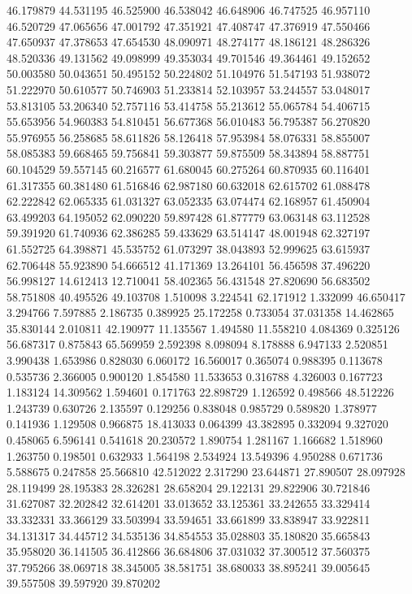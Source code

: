 46.179879
44.531195
46.525900
46.538042
46.648906
46.747525
46.957110
46.520729
47.065656
47.001792
47.351921
47.408747
47.376919
47.550466
47.650937
47.378653
47.654530
48.090971
48.274177
48.186121
48.286326
48.520336
49.131562
49.098999
49.353034
49.701546
49.364461
49.152652
50.003580
50.043651
50.495152
50.224802
51.104976
51.547193
51.938072
51.222970
50.610577
50.746903
51.233814
52.103957
53.244557
53.048017
53.813105
53.206340
52.757116
53.414758
55.213612
55.065784
54.406715
55.653956
54.960383
54.810451
56.677368
56.010483
56.795387
56.270820
55.976955
56.258685
58.611826
58.126418
57.953984
58.076331
58.855007
58.085383
59.668465
59.756841
59.303877
59.875509
58.343894
58.887751
60.104529
59.557145
60.216577
61.680045
60.275264
60.870935
60.116401
61.317355
60.381480
61.516846
62.987180
60.632018
62.615702
61.088478
62.222842
62.065335
61.031327
63.052335
63.074474
62.168957
61.450904
63.499203
64.195052
62.090220
59.897428
61.877779
63.063148
63.112528
59.391920
61.740936
62.386285
59.433629
63.514147
48.001948
62.327197
61.552725
64.398871
45.535752
61.073297
38.043893
52.999625
63.615937
62.706448
55.923890
54.666512
41.171369
13.264101
56.456598
37.496220
56.998127
14.612413
12.710041
58.402365
56.431548
27.820690
56.683502
58.751808
40.495526
49.103708
1.510098
3.224541
62.171912
1.332099
46.650417
3.294766
7.597885
2.186735
0.389925
25.172258
0.733054
37.031358
14.462865
35.830144
2.010811
42.190977
11.135567
1.494580
11.558210
4.084369
0.325126
56.687317
0.875843
65.569959
2.592398
8.098094
8.178888
6.947133
2.520851
3.990438
1.653986
0.828030
6.060172
16.560017
0.365074
0.988395
0.113678
0.535736
2.366005
0.900120
1.854580
11.533653
0.316788
4.326003
0.167723
1.183124
14.309562
1.594601
0.171763
22.898729
1.126592
0.498566
48.512226
1.243739
0.630726
2.135597
0.129256
0.838048
0.985729
0.589820
1.378977
0.141936
1.129508
0.966875
18.413033
0.064399
43.382895
0.332094
9.327020
0.458065
6.596141
0.541618
20.230572
1.890754
1.281167
1.166682
1.518960
1.263750
0.198501
0.632933
1.564198
2.534924
13.549396
4.950288
0.671736
5.588675
0.247858
25.566810
42.512022
2.317290
23.644871
27.890507
28.097928
28.119499
28.195383
28.326281
28.658204
29.122131
29.822906
30.721846
31.627087
32.202842
32.614201
33.013652
33.125361
33.242655
33.329414
33.332331
33.366129
33.503994
33.594651
33.661899
33.838947
33.922811
34.131317
34.445712
34.535136
34.854553
35.028803
35.180820
35.665843
35.958020
36.141505
36.412866
36.684806
37.031032
37.300512
37.560375
37.795266
38.069718
38.345005
38.581751
38.680033
38.895241
39.005645
39.557508
39.597920
39.870202
